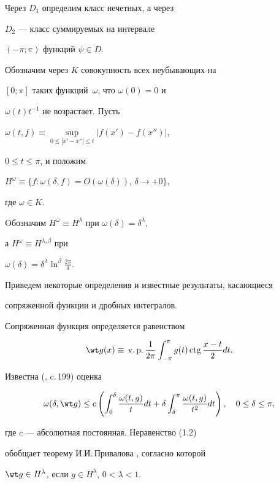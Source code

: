 Через $D_1$ определим класс нечетных, а через


$D_2$ --- класс суммируемых на интервале


$(-\pi;\pi)$ функций $\psi\in D$.


Обозначим через $K$ совокупность всех неубывающих на


$[0;\pi]$ таких функций~$\omega$, что $\omega(0)=0$ и


$\omega(t)t^{-1}$ не возрастает. Пусть


$\omega(t,f)\equiv\sup\limits_{0\le|x'-x''|\le t}|f(x')-f(x'')|$,


$0\le t\le\pi$, и положим


$H^\omega\equiv\{f:\omega(\delta,f)=O(\omega(\delta))$, $\delta\to +0\}$,


где $\omega\in K$.


Oбозначим $H^\omega\equiv H^\lambda$ при $\omega(\delta)=\delta^\lambda$, 


а $H^\omega\equiv H^{\lambda,\beta}$ при


$\omega(\delta)=\delta^\lambda\ln^\beta\frac{2\pi}{\delta}$.





Приведем некоторые определения и известные результаты, касающиеся


сопряженной функции и дробных интегралов.


Сопряженная функция определяется равенством


$$


\wt g(x)\equiv\, \text{v.\,p.}\,\frac{1}{2\pi}\int_{-\pi}^\pi g(t)\ctg


\frac{x-t}{2}dt.


$$


Известна (\cite{zig}, c.\,199) оценка 


\begin{equation}


\omega(\delta,\wt g)\le


c\left(\int_0^\delta\frac{\omega(t,g)}{t}dt+


\delta\int_\delta^\pi\frac{\omega(t,g)}{t^2}dt\right),


\quad 0\le\delta\le\pi,


\end{equation}


где $c$ --- абсолютная постоянная. Неравенство (1.2) 


обобщает теорему И.И.\,Привалова \cite{pri}, согласно которой


$\wt g\in H^\lambda$, если $g\in H^\lambda$, $0<\lambda<1$.





